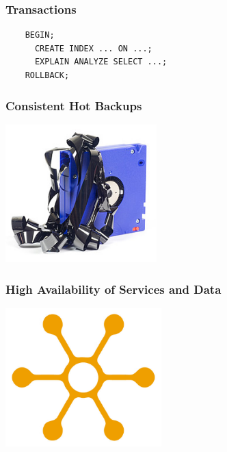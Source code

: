 \documentclass{beamer}
\begin{document}
\begin{frame}[fragile]
  \frametitle{Transactions}

  \begin{verbatim}
    BEGIN;
      CREATE INDEX ... ON ...;
      EXPLAIN ANALYZE SELECT ...;
    ROLLBACK;
  \end{verbatim}
\end{frame}

\begin{frame}
  \frametitle{Consistent Hot Backups}

  \begin{center}
    \includegraphics[height=2.1in]{online-backup.jpg}
  \end{center}
\end{frame}

\begin{frame}
  \frametitle{High Availability of Services and Data}

  \begin{center}
    \includegraphics[height=2.1in]{distribution.jpg}
  \end{center}
\end{frame}
\end{document}
